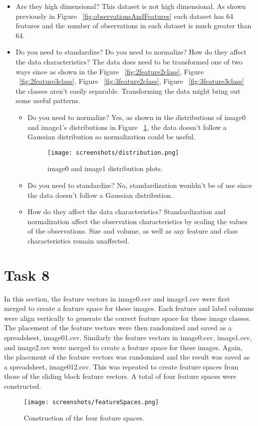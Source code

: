 \documentclass[sigconf]{acmart}
\begin{document}
\begin{itemize}
      \item Are they high dimensional? This dataset is not high dimensional. As shown previously in Figure ~\ref{fig:observationsAndFeatures} each dataset has 64 features and the number of observations in each dataset is much greater than 64.
      \item Do you need to standardize? Do you need to normalize? How do they affect the data characteristics? The data does need to be transformed one of two ways since as shown in the Figure ~\ref{fig:2feature2class}, Figure ~\ref{fig:2feature3class}, Figure ~\ref{fig:3feature2class}, Figure ~\ref{fig:3feature3class} the classes aren't easily separable. Transforming the data might bring out some useful patterns.
      \begin{itemize}
          \item Do you need to normalize? Yes, as shown in the distributions of image0 and image1's distributions in Figure ~\ref{fig:distribution}, the data doesn't follow a Gaussian distribution so normalization could be useful.
            \begin{figure}[h]
            \centering
            \texttt{[image: screenshots/distribution.png]}
            \caption{image0 and image1 distribution plots.}
            \label{fig:distribution}
            \end{figure}
          \item Do you need to standardize? No, standardization wouldn't be of use since the data doesn't follow a Gaussian distribution.
          \item How do they affect the data characteristics? Standardization and normalization affect the observation characteristics by scaling the values of the observations. Size and volume, as well as any feature and class characteristics remain unaffected.
      \end{itemize}
\end{itemize}

\section{Task 8}
In this section, the feature vectors in image0.csv and image1.csv were first merged to create a feature space for these images. Each feature and label columns were align vertically to generate the correct feature space for these image classes. The placement of the feature vectors were then randomized and saved as a spreadsheet, image01.csv. Similarly the feature vectors in image0.csv, image1.csv, and image2.csv were merged to create a feature space for these images. Again, the placement of the feature vectors was randomized and the result was saved as a spreadsheet, image012.csv. This was repeated to create feature spaces from those of the sliding block feature vectors. A total of four feature spaces were constructed.
\begin{figure}[h]
 \centering
    \texttt{[image: screenshots/featureSpaces.png]}
    \caption{Construction of the four feature spaces.}
\end{figure}
\end{document}

